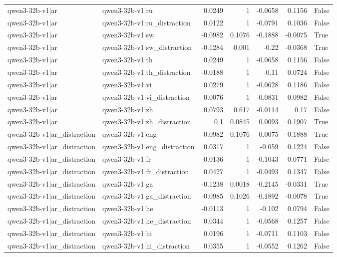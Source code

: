 \begin{table}
\begin{tabular}{l l r r r r l}
qwen3-32b-v1|ar & qwen3-32b-v1|ru & 0.0249 & 1 & -0.0658 & 0.1156 & False \\
qwen3-32b-v1|ar & qwen3-32b-v1|ru_distraction & 0.0122 & 1 & -0.0791 & 0.1036 & False \\
qwen3-32b-v1|ar & qwen3-32b-v1|sw & -0.0982 & 0.1076 & -0.1888 & -0.0075 & True \\
qwen3-32b-v1|ar & qwen3-32b-v1|sw_distraction & -0.1284 & 0.001 & -0.22 & -0.0368 & True \\
qwen3-32b-v1|ar & qwen3-32b-v1|th & 0.0249 & 1 & -0.0658 & 0.1156 & False \\
qwen3-32b-v1|ar & qwen3-32b-v1|th_distraction & -0.0188 & 1 & -0.11 & 0.0724 & False \\
qwen3-32b-v1|ar & qwen3-32b-v1|vi & 0.0279 & 1 & -0.0628 & 0.1186 & False \\
qwen3-32b-v1|ar & qwen3-32b-v1|vi_distraction & 0.0076 & 1 & -0.0831 & 0.0982 & False \\
qwen3-32b-v1|ar & qwen3-32b-v1|zh & 0.0793 & 0.617 & -0.0114 & 0.17 & False \\
qwen3-32b-v1|ar & qwen3-32b-v1|zh_distraction & 0.1 & 0.0845 & 0.0093 & 0.1907 & True \\
qwen3-32b-v1|ar_distraction & qwen3-32b-v1|eng & 0.0982 & 0.1076 & 0.0075 & 0.1888 & True \\
qwen3-32b-v1|ar_distraction & qwen3-32b-v1|eng_distraction & 0.0317 & 1 & -0.059 & 0.1224 & False \\
qwen3-32b-v1|ar_distraction & qwen3-32b-v1|fr & -0.0136 & 1 & -0.1043 & 0.0771 & False \\
qwen3-32b-v1|ar_distraction & qwen3-32b-v1|fr_distraction & 0.0427 & 1 & -0.0493 & 0.1347 & False \\
qwen3-32b-v1|ar_distraction & qwen3-32b-v1|ga & -0.1238 & 0.0018 & -0.2145 & -0.0331 & True \\
qwen3-32b-v1|ar_distraction & qwen3-32b-v1|ga_distraction & -0.0985 & 0.1026 & -0.1892 & -0.0078 & True \\
qwen3-32b-v1|ar_distraction & qwen3-32b-v1|he & -0.0113 & 1 & -0.102 & 0.0794 & False \\
qwen3-32b-v1|ar_distraction & qwen3-32b-v1|he_distraction & 0.0344 & 1 & -0.0568 & 0.1257 & False \\
qwen3-32b-v1|ar_distraction & qwen3-32b-v1|hi & 0.0196 & 1 & -0.0711 & 0.1103 & False \\
qwen3-32b-v1|ar_distraction & qwen3-32b-v1|hi_distraction & 0.0355 & 1 & -0.0552 & 0.1262 & False \\

\end{tabular}
\end{table}
